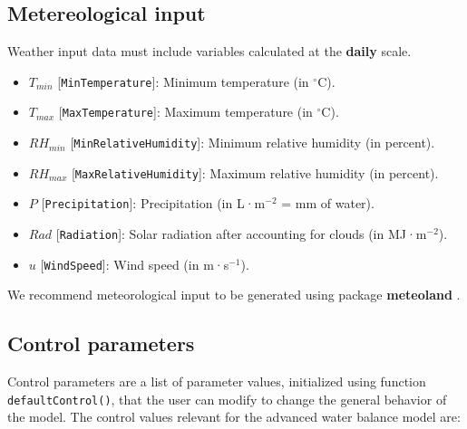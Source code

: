 \documentclass[]{book}
\providecommand{\tightlist}{%
  \setlength{\itemsep}{0pt}\setlength{\parskip}{0pt}}
\begin{document}
\hypertarget{metereological-input-1}{%
\subsection{Metereological input}\label{metereological-input-1}}

Weather input data must include variables calculated at the \textbf{daily} scale.

\begin{itemize}
\tightlist
\item
  \(T_{min}\) {[}\texttt{MinTemperature}{]}: Minimum temperature (in \(^{\circ} \mathrm{C}\)).
\item
  \(T_{max}\) {[}\texttt{MaxTemperature}{]}: Maximum temperature (in \(^{\circ} \mathrm{C}\)).
\item
  \(RH_{min}\) {[}\texttt{MinRelativeHumidity}{]}: Minimum relative humidity (in percent).
\item
  \(RH_{max}\) {[}\texttt{MaxRelativeHumidity}{]}: Maximum relative humidity (in percent).
\item
  \(P\) {[}\texttt{Precipitation}{]}: Precipitation (in L·m\(^{-2}\) = mm of water).
\item
  \(Rad\) {[}\texttt{Radiation}{]}: Solar radiation after accounting for clouds (in MJ·m\(^{-2}\)).
\item
  \(u\) {[}\texttt{WindSpeed}{]}: Wind speed (in m·s\(^{-1}\)).
\end{itemize}

We recommend meteorological input to be generated using package \textbf{meteoland} \citep{DeCaceres2018}.

\hypertarget{control-parameters-1}{%
\subsection{Control parameters}\label{control-parameters-1}}

Control parameters are a list of parameter values, initialized using function \texttt{defaultControl()}, that the user can modify to change the general behavior of the model. The control values relevant for the advanced water balance model are:
\end{document}
